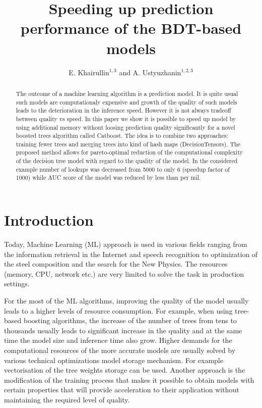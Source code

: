 \documentclass[a4paper]{jpconf}
\begin{document}
\title{Speeding up prediction performance of the BDT-based models}

\author{
 E. Khairullin$^{1, 3}$
 and
 A. Ustyuzhanin$^{1, 2, 3}$
}
\address{$^{1}$ Moscow Institute of Physics and Technology}
\address{$^{2}$ National Research University Higher School of Economics, 20 Myasnitskaya st., Moscow 101000, Russia}
\address{$^{3}$ Yandex School of Data Analysis, 11/2, Timura Frunze st., Moscow 119021, Russia}


\begin{abstract}
The outcome of a machine learning algorithm is a prediction model. It is quite usual such models are computationaly expensive and growth of the quality of such models leads to the deterioration in the inference speed. However it is not always tradeoff between quality vs speed. In this paper we show it is possible to speed up model by using additional memory without loosing prediction quality significantly for a novel boosted trees algorithm called Catboost. The idea is to combine two approaches: training fewer trees and merging trees into kind of hash maps (DecisionTensors). The proposed method allows for pareto-optimal reduction of the computational complexity of the decision tree model with regard to the quality of the model. In the considered example number of lookups was decreased from 5000 to only 6 (speedup factor of 1000) while AUC score of the model was reduced by less than per mil.
\end{abstract}

\section{Introduction}
Today, Machine Learning (ML) approach is used in various fields ranging from the information retrieval in the Internet and speech recognition to optimization of the steel composition and the search for the New Physics.
The resources (memory, CPU, network etc.) are very limited to solve the task in production settings.

For the most of the ML algorithms, improving the quality of the model usually leads to a higher levels of resource consumption. For example, when using tree-based boosting algorithms, the increase of the number of trees from tens to thousands usually leads to significant increase in the quality and at the same time the model size and inference time also grow. Higher demands for the computational resources of the more accurate models are usually solved by various technical optimizations model storage mechanism. For example vectorisation of the tree weights storage can be used. Another approach is the modification of the training process that makes it possible to obtain models with certain properties that will provide acceleration to their application without maintaining the required level of quality.
\end{document}
